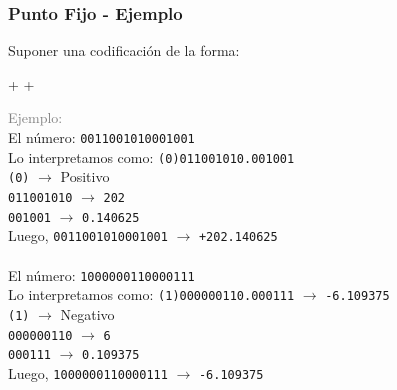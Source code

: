 \documentclass[aspectratio=169]{beamer}
\begin{document}
\begin{frame}[fragile,t]
    \frametitle{Punto Fijo - Ejemplo}
    Suponer una codificación de la forma:\\
    \begin{center}
     + \fbox{\vphantom{fg} \textcolor{verde}{parte entera (9 bits)}} + \fbox{\vphantom{fg} \textcolor{verdeO}{parte fraccionaria (6 bits)}}\\
    \end{center}
    \small
    \textcolor{gray}{Ejemplo:}\\
    \hspace{1cm} El número: \texttt{0011001010001001}\\ \pause
    \hspace{1cm} Lo interpretamos como: \texttt{(0)}\textcolor{verde}{\texttt{011001010}}\texttt{.}\textcolor{verdeO}{\texttt{001001}}\\ \pause
    \hspace{1cm} \texttt{(0)} $\rightarrow$ Positivo\\ \pause
    \hspace{1cm} \textcolor{verde}{\texttt{011001010}} $\rightarrow$ \texttt{202}\\ \pause
    \hspace{1cm} \textcolor{verdeO}{\texttt{001001}} $\rightarrow$ \texttt{0.140625}\\ \pause
    \hspace{1cm} Luego, \texttt{0011001010001001} $\rightarrow$ \texttt{+202.140625}\\ \pause
    \hspace{1cm} \\ 
    \hspace{1cm} El número: \texttt{1000000110000111}\\ \pause
    \hspace{1cm} Lo interpretamos como: \texttt{(1)}\textcolor{verde}{\texttt{000000110}}\texttt{.}\textcolor{verdeO}{\texttt{000111}} $\rightarrow$ \texttt{-6.109375}\\
    \hspace{1cm} \texttt{(1)} $\rightarrow$ Negativo\\
    \hspace{1cm} \textcolor{verde}{\texttt{000000110}} $\rightarrow$ \texttt{6}\\
    \hspace{1cm} \textcolor{verdeO}{\texttt{000111}} $\rightarrow$ \texttt{0.109375}\\
    \hspace{1cm} Luego, \texttt{1000000110000111} $\rightarrow$ \texttt{-6.109375}
\end{frame}
\end{document}
